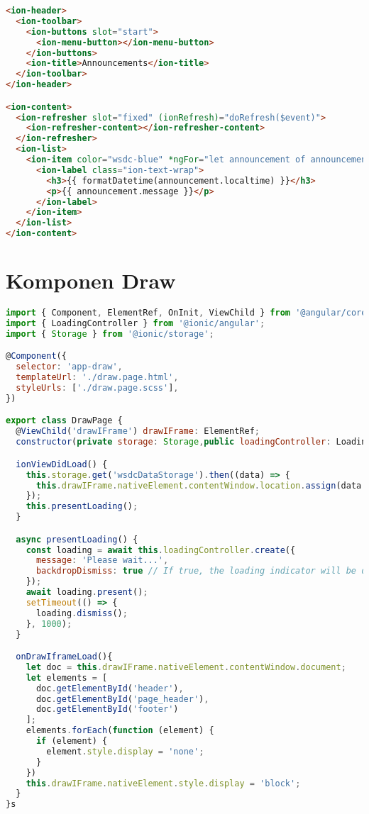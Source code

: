 \begin{lstlisting}[language=html, label={lst:announcements.page.html}, caption=annoncement.page.html]
<ion-header>
  <ion-toolbar>
    <ion-buttons slot="start">
      <ion-menu-button></ion-menu-button>
    </ion-buttons>
    <ion-title>Announcements</ion-title>
  </ion-toolbar>
</ion-header>

<ion-content>
  <ion-refresher slot="fixed" (ionRefresh)="doRefresh($event)">
    <ion-refresher-content></ion-refresher-content>
  </ion-refresher>
  <ion-list>
    <ion-item color="wsdc-blue" *ngFor="let announcement of announcements; let i = index">
      <ion-label class="ion-text-wrap">
        <h3>{{ formatDatetime(announcement.localtime) }}</h3>
        <p>{{ announcement.message }}</p>
      </ion-label>
    </ion-item>
  </ion-list>
</ion-content>
\end{lstlisting} 

\section{Komponen Draw} 
\label{sec:lampiranKomponenDraw}

\begin{lstlisting}[language=JavaScript, label={lst:draw.page.ts}, caption=draw.page.ts]
import { Component, ElementRef, OnInit, ViewChild } from '@angular/core';
import { LoadingController } from '@ionic/angular';
import { Storage } from '@ionic/storage';

@Component({
  selector: 'app-draw',
  templateUrl: './draw.page.html',
  styleUrls: ['./draw.page.scss'],
})

export class DrawPage {
  @ViewChild('drawIFrame') drawIFrame: ElementRef;
  constructor(private storage: Storage,public loadingController: LoadingController) { }

  ionViewDidLoad() {
    this.storage.get('wsdcDataStorage').then((data) => {
      this.drawIFrame.nativeElement.contentWindow.location.assign(data.draws);
    });
    this.presentLoading();
  }

  async presentLoading() {
    const loading = await this.loadingController.create({
      message: 'Please wait...',
      backdropDismiss: true // If true, the loading indicator will be dismissed when the backdrop is clicked.
    });
    await loading.present();
    setTimeout(() => {
      loading.dismiss();
    }, 1000);
  }

  onDrawIframeLoad(){
    let doc = this.drawIFrame.nativeElement.contentWindow.document;
    let elements = [
      doc.getElementById('header'),
      doc.getElementById('page_header'),
      doc.getElementById('footer')
    ];
    elements.forEach(function (element) {
      if (element) {
        element.style.display = 'none';
      }
    })
    this.drawIFrame.nativeElement.style.display = 'block';
  }
}s
\end{lstlisting} 

